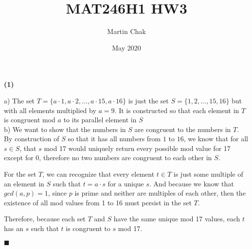 \documentclass[20pt]{article}
\title{MAT246H1 HW3}
\author{Martin Chak}
\date{May 2020}
\begin{document}
\noindent
\textbf{(1)}\\
\begin{text}
    a) The set $T = \{ a \cdot 1, a \cdot 2, ... , a \cdot 15, a \cdot 16\}$ is just the set $S = \{1, 2, ... , 15, 16\}$ but with all elements multiplied by $a = 9$. It is constructed so that each element in $T$ is congruent mod $a$ to its parallel element in $S$\\
    
    \noindent
    b) We want to show that the numbers in $S$ are congruent to the numbers in $T$. By construction of $S$ so that it has all numbers from $1$ to $16$, we know that for all $s \in S$, that $s$ mod 17 would uniquely return every possible mod value for 17 except for 0, therefore no two numbers are congruent to each other in $S$.
    
    For the set $T$, we can recognize that every element $t \in T$ is just some multiple of an element in $S$ such that $t = a \cdot s$ for a unique $s$. And because we know that $gcd(a, p) = 1$, since $p$ is prime and neither are multiples of each other, then the existence of all mod values from 1 to 16 must persist in the set $T$.
    
    Therefore, because each set $T$ and $S$ have the same unique mod 17 values, each $t$ has an $s$ such that $t$ is congruent to $s$ mod 17.
    
    \hfill $\blacksquare$
\end{text}\\
\end{document}
